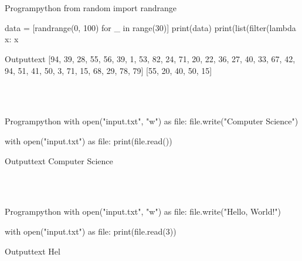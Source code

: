 \documentclass[11pt]{ipu-python}
\begin{document}
    \\~\\
    \begin{code}
        {Program}{python}
from random import randrange

data = [randrange(0, 100) for _ in range(30)]
print(data)
print(list(filter(lambda x: x %
    \end{code}
    \begin{code}
        {Output}{text}
[94, 39, 28, 55, 56, 39, 1, 53, 82, 24, 71, 20, 22, 36, 27, 40, 33, 67, 42, 94, 51, 41, 50, 3, 71, 15, 68, 29, 78, 79]
[55, 20, 40, 50, 15]
    \end{code}

    \\~\\
    \begin{code}
        {Program}{python}
with open("input.txt", "w") as file:
    file.write("Computer Science")

with open("input.txt") as file:
    print(file.read())
    \end{code}
    \begin{code}
        {Output}{text}
Computer Science
    \end{code}

    \\~\\
    \begin{code}
        {Program}{python}
with open("input.txt", "w") as file:
    file.write("Hello, World!")

with open("input.txt") as file:
    print(file.read(3))
    \end{code}
    \begin{code}
        {Output}{text}
Hel
    \end{code}
\end{document}
